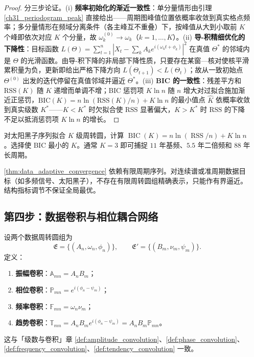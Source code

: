 \begin{proof}
分三步论证。(i) \textbf{频率初始化的渐近一致性}：单分量情形由引理 \ref{ch31_periodogram_peak} 直接给出——周期图峰值位置依概率收敛到真实格点频率；多分量情形在频域分离条件（各主峰互不重叠）下，按峰值从大到小取前 $K$ 个峰即依次对应 $K$ 个分量，故 $\omega_k^{(0)} \to \omega_k$（$k = 1,\dots,K$）。(ii) \textbf{导-积精细优化的下降性}：目标函数 $L(\Theta) = \sum_{t=1}^{n} |X_t - \sum_k A_k e^{i(\omega_k t + \phi_k)}|^2$ 在真值 $\Theta^*$ 的邻域内是 $\Theta$ 的光滑函数。由导-积下降的非局部下降性质，只要存在某窗—核对使核平滑累积量为负，更新即给出严格下降方向 $L(\Theta_{t+1}) < L(\Theta_t)$；故从一致初始点 $\Theta^{(0)}$ 出发的迭代停留在真值邻域并逼近 $\Theta^*$。(iii) \textbf{BIC 的一致性}：残差平方和 $\text{RSS}(K)$ 随 $K$ 递增而单调不增；BIC 惩罚项 $K\ln n$ 随 $n$ 增大对过拟合施加渐近正惩罚，$\text{BIC}(K) = n\ln(\text{RSS}(K)/n) + K\ln n$ 的最小值点 $\hat{K}$ 依概率收敛到真实级数 $K^*$——$K < K^*$ 时欠拟合使 $\text{RSS}$ 显著偏大，$K > K^*$ 时 $\text{RSS}$ 的下降不足以抵消惩罚项 $K\ln n$ 的增长。
\end{proof}

\begin{example}\label{ex:data_bic}
对太阳黑子序列拟合 $K$ 级周转圆，计算 $\operatorname{BIC}(K)=n\ln(\operatorname{RSS}/n)+K\ln n$。选择使 BIC 最小的 $K$。通常 $K=3$ 即可捕捉 $11$ 年基频、$5.5$ 年二倍频和 $88$ 年长周期。
\end{example}

\begin{remark}[动态调节的边界]\label{rem:data_adaptive_boundary}
\cref{thm:data_adaptive_convergence} 依赖有限周期序列。对连续谱或准周期数据目标（如多频信号、太阳黑子），不存在有限周转圆组精确表示，只能作有界逼近。结构指标调节不保证全局最优。
\end{remark}

\subsection{第四步：数据卷积与相位耦合网络}

\begin{definition}\label{def:data_convolution_types}
设两个数据周转圆组为
\[
\mathfrak E=\{(A_n,\omega_n,\phi_n)\},\qquad
\mathfrak E'=\{(B_m,\nu_m,\psi_m)\}.
\]
定义：
\begin{enumerate}[label=(\roman*)]
    \item \textbf{振幅卷积}：$\mathbb A_{mn}=A_nB_m$；
    \item \textbf{相位卷积}：$\mathbb P_{mn}=e^{i(\phi_n-\psi_m)}$；
    \item \textbf{频率卷积}：$\mathbb F_{mn}=\omega_n\nu_m$；
    \item \textbf{趋势卷积}：$\mathbb T_{mn}=A_nB_m e^{i(\phi_n-\psi_m)}=A_nB_m\mathbb P_{mn}$。
\end{enumerate}
这与「级数与卷积」章 \cref{def:amplitude_convolution}、\cref{def:phase_convolution}、\cref{def:frequency_convolution}、\cref{def:tendency_convolution} 一致。
\end{definition}

